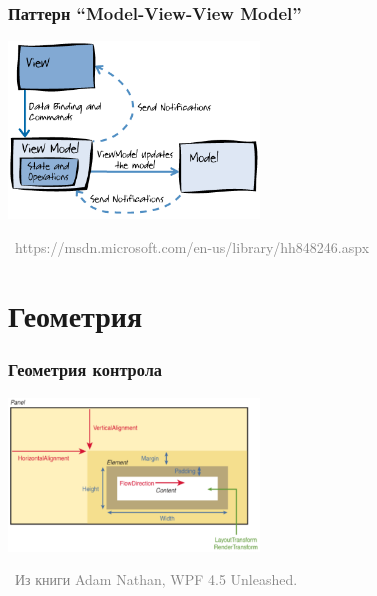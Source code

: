 \documentclass[xetex,mathserif,serif]{beamer}
\newcommand{\attribution}[1] {
\vspace{-5mm}\begin{flushright}\begin{scriptsize}\textcolor{gray}{\textcopyright\, #1}\end{scriptsize}\end{flushright}
}
\begin{document}
	\begin{frame}
		\frametitle{Паттерн ``Model-View-View Model''}
		\begin{center}
			\includegraphics[width=0.5\textwidth]{mvvm.png}
		\end{center}
		\attribution{https://msdn.microsoft.com/en-us/library/hh848246.aspx}
	\end{frame}

	\section{Геометрия}

	\begin{frame}
		\frametitle{Геометрия контрола}
		\begin{center}
			\includegraphics[width=0.5\textwidth]{controlGeometry.png}
		\end{center}
		\attribution{Из книги Adam Nathan, WPF 4.5 Unleashed.}
	\end{frame}
\end{document}

